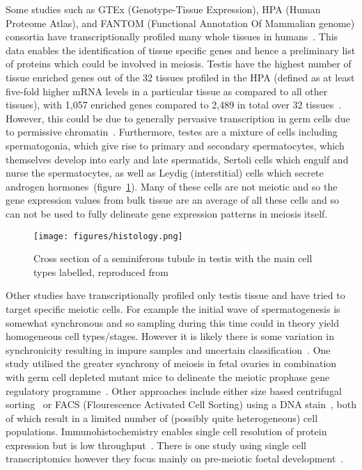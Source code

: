 Some studies such as GTEx (Genotype-Tissue Expression), HPA (Human Proteome Atlas), and FANTOM (Functional Annotation Of Mammalian genome) consortia have transcriptionally profiled many whole tissues in humans~\cite{Mele2015Human,Uhlen2015Tissuebased,Uhlen2016Transcriptomics}. This data enables the identification of tissue specific genes and hence a preliminary list of proteins which could be involved in meiosis. Testis have the highest number of tissue enriched genes out of the 32 tissues profiled in the HPA (defined as at least five-fold higher mRNA levels in a particular tissue as compared to all other tissues), with 1,057 enriched genes compared to 2,489 in total over 32 tissues~\cite{TheHumanProteinAtlasHuman}. However, this could be due to generally pervasive transcription in germ cells due to permissive chromatin~\cite{Soumillon2013Cellular}. Furthermore, testes are a mixture of cells including spermatogonia, which give rise to primary and secondary spermatocytes, which themselves develop into early and late spermatids, Sertoli cells which engulf and nurse the spermatocytes, as well as Leydig (interstitial) cells which secrete androgen hormones~(figure~\ref{fig:histology}). Many of these cells are not meiotic and so the gene expression values from bulk tissue are an average of all these cells and so can not be used to fully delineate gene expression patterns in meiosis itself.

\begin{figure}[H]
	\centering
	\texttt{[image: figures/histology.png]}
	\caption{Cross section of a seminiferous tubule in testis with the main cell types labelled, reproduced from~\cite{Junqueira2005Basic}}
	\label{fig:histology}
\end{figure}

Other studies have transcriptionally profiled only testis tissue and have tried to target specific meiotic cells. For example the initial wave of spermatogenesis is somewhat synchronous and so sampling during this time could in theory yield homogeneous cell types/stages. However it is likely there is some variation in synchronicity resulting in impure samples and uncertain classification~\cite{Laiho2013Transcriptome,Ball2016Regulatory}. One study utilised the greater synchrony of meiosis in fetal ovaries in combination with germ cell depleted mutant mice to delineate the meiotic prophase gene regulatory programme~\cite{Soh2015Gene}. Other approaches include either size based centrifugal sorting~\cite{Soumillon2013Cellular,Buard2009Distinct,Grabske1975Centrifugal} or FACS (Flourescence Activated Cell Sorting) using a DNA stain~\cite{daCruz2016Transcriptome}, both of which result in a limited number of (possibly quite heterogeneous) cell populations. Immunohistochemistry enables single cell resolution of protein expression but is low throughput~\cite{Djureinovic2014Human}. There is one study using single cell transcriptomics however they focus mainly on pre-meiotic foetal development~\cite{Li2017SingleCell}.

